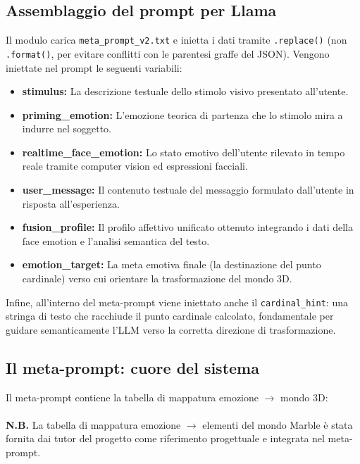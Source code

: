 \documentclass[11pt]{report}
\begin{document}
\subsection{Assemblaggio del prompt per Llama}
 
Il modulo carica \texttt{meta\_prompt\_v2.txt} e inietta i dati tramite \texttt{.replace()} (non \texttt{.format()}, per evitare conflitti con le parentesi graffe del JSON). Vengono iniettate nel prompt le seguenti variabili:
\begin{itemize}
    \item \textbf{stimulus:} La descrizione testuale dello stimolo visivo presentato all'utente.
    \item \textbf{priming\_emotion:} L'emozione teorica di partenza che lo stimolo mira a indurre nel soggetto.
    \item \textbf{realtime\_face\_emotion:} Lo stato emotivo dell'utente rilevato in tempo reale tramite computer vision ed espressioni facciali.
    \item \textbf{user\_message:} Il contenuto testuale del messaggio formulato dall'utente in risposta all'esperienza.
    \item \textbf{fusion\_profile:} Il profilo affettivo unificato ottenuto integrando i dati della face emotion e l'analisi semantica del testo.
    \item \textbf{emotion\_target:} La meta emotiva finale (la destinazione del punto cardinale) verso cui orientare la trasformazione del mondo 3D.
\end{itemize}

Infine, all'interno del meta-prompt viene iniettato anche il \texttt{cardinal\_hint}: una stringa di testo che racchiude il punto cardinale calcolato, fondamentale per guidare semanticamente l'LLM verso la corretta direzione di trasformazione.
 
\subsection{Il meta-prompt: cuore del sistema}
 
Il meta-prompt contiene la tabella di mappatura emozione $\rightarrow$ mondo 3D:
 
\paragraph{}

\textbf{N.B.} La tabella di mappatura emozione $\rightarrow$ elementi del mondo Marble è stata fornita dai tutor del progetto come riferimento progettuale e integrata nel meta-prompt.
\end{document}
